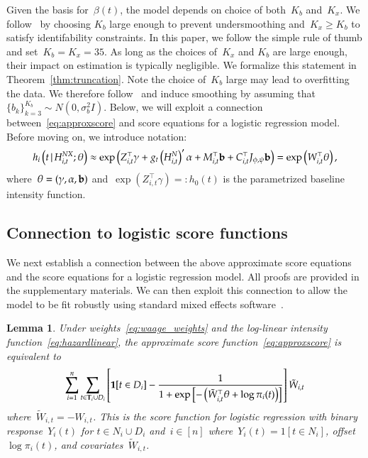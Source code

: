 \documentclass[11pt]{amsart}
\newtheorem{lemma}[thm]{Lemma}
\def\given{\, | \,}
\def\bfT{{\bf T}}
\begin{document}
Given the basis for~$\beta(t)$, the model depends on choice of
both~$K_b$ and~$K_x$.  We follow~\cite{Ruppert2002} by choosing $K_b$
large enough to prevent undersmoothing and~$K_x \geq K_b$ to satisfy
identifability constraints.
In this paper, we follow the simple rule of thumb and set~$K_b = K_x =
35$.
As long as the choices of~$K_x$ and $K_b$ are large enough, their
impact on estimation is typically negligible. 
We formalize this statement in Theorem~\ref{thm:truncation}.
Note the choice of~$K_b$ large may lead to overfitting the data.
We therefore follow~\cite{GoldSmith2015} and induce smoothing by
assuming that~$\{ b_k \}_{k=3}^{K_b} \sim N(0, \sigma_b^2 I)$.
Below, we will exploit a connection between~\eqref{eq:approxscore}
and score equations for a logistic regression model.  Before moving
on, we introduce notation:
\begin{equation*}
h_i \left( t \given  H_{i,t}^{NX} ; \theta \right) \approx
\exp \left( Z_{i,t}^\top \gamma + g_t \left( H_{i,t}^{N} \right)^{\prime} \alpha
  + M_{i,t}^\top {\bf b} + C_{i,t}^\top J_{\phi, \psi} {\bf b} \right)
= \exp \left( W_{i,t}^\top \theta \right),
\end{equation*}
where~$\theta = (\gamma, \alpha, {\bf b})$ and~$\exp ( Z_{i,t}^\top
\gamma) =: h_0 (t)$ is the parametrized baseline intensity function.


\subsection{Connection to logistic score functions}

We next establish a connection between the above approximate score 
equations and the score equations for a logistic regression model.
All proofs are provided in the supplementary materials.
We can then exploit this connection to allow the model to be fit
robustly using standard mixed effects software~\citep{Ruppert2002,
  McCulloch2001}.

\begin{lemma} \normalfont
\label{lemma:logistic}
Under weights~\eqref{eq:waage_weights} and the log-linear intensity
function~\eqref{eq:hazardlinear}, the approximate score
function~\eqref{eq:approxscore} is equivalent to 
\[
\sum_{i=1}^n \sum_{t \in \bfT_i \cup D_i } \left[ {\bf 1}[t \in D_i]
  - \frac{1}{1 + \exp \left[- \left( \tilde{W}_{i,t}^\top \theta +
        \log \pi_i (t) \right) \right]} \right] \tilde{W}_{i,t} 
\]
where~$\tilde W_{i,t} = -W_{i,t}$. This is the score function for
logistic regression with binary response~$Y_i(t)$ for $t \in N_i \cup
D_i$ and~$i \in [n]$ where~$Y_i(t) = 1[t \in N_i]$, offset~$\log \pi_i
(t)$, and covariates~$\tilde W_{i,t}$. 
\end{lemma}
\end{document}
